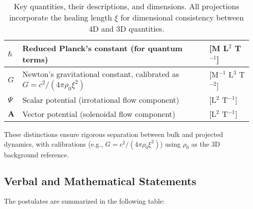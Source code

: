 \begin{table}[H]
\begin{tabular}{|l|l|l|}
\hline
$\hbar$ & Reduced Planck's constant (for quantum terms) & [M L$^2$ T$^{-1}$] \\
\hline
$G$ & Newton's gravitational constant, calibrated as $G = c^2 / (4\pi \rho_0 \xi^2)$ & [M$^{-1}$ L$^3$ T$^{-2}$] \\
\hline
$\Psi$ & Scalar potential (irrotational flow component) & [L$^2$ T$^{-1}$] \\
\hline
$\mathbf{A}$ & Vector potential (solenoidal flow component) & [L$^2$ T$^{-1}$] \\
\hline
\end{tabular}
\caption{Key quantities, their descriptions, and dimensions. All projections incorporate the healing length $\xi$ for dimensional consistency between 4D and 3D quantities.}
\label{tab:notation}
\end{table}

These distinctions ensure rigorous separation between bulk and projected dynamics, with calibrations (e.g., $G = c^2 / (4\pi \rho_0 \xi^2)$) using $\rho_0$ as the 3D background reference.

\subsection{Verbal and Mathematical Statements}

The postulates are summarized in the following table:

